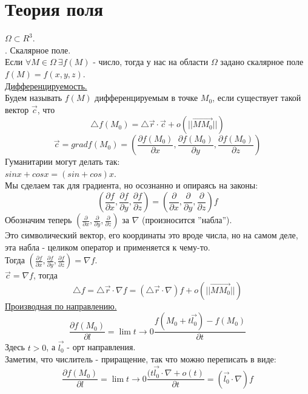 \documentclass[12pt]{article}
\begin{document}
\section{Теория поля}
$\Omega \subset R^3$.\\
. Скалярное поле.\\
Если $\forall M \in \Omega \ \exists f(M)$ - число, тогда у нас на области $\Omega$ задано скалярное поле $f(M) = f(x,y,z)$.\\
\uline{Дифференцируемость.}\\
Будем называть $f(M)$ дифференцируемым в точке $M_0$, если существует такой вектор $\overrightarrow{c}$, что\\
$${\bigtriangleup f}(M_0) = {\bigtriangleup \overrightarrow{r}} \cdot \overrightarrow{c} + o(||\overrightarrow{MM_0}||)$$
$$\overrightarrow{c} = grad f(M_0) = (\frac{\partial f(M_0)}{\partial x}, \frac{\partial f(M_0)}{\partial y}, \frac{\partial f(M_0)}{\partial z})$$
Гуманитарии могут делать так:\\
$sinx + cosx = (sin+cos)x$.\\
Мы сделаем так для градиента, но осознанно и опираясь на законы:\\
$$(\frac{\partial f}{\partial x},\frac{\partial f}{\partial y}, \frac{\partial f}{\partial z}) = (\frac{\partial}{\partial x},\frac{\partial}{\partial y},\frac{\partial}{\partial z})f$$
Обозначим теперь $(\frac{\partial}{\partial x},\frac{\partial}{\partial y},\frac{\partial}{\partial z})$ за $\nabla$ (произносится ''набла'').\\
Это символический вектор, его координаты это вроде числа, но на самом деле, эта набла - целиком оператор и применяется к чему-то.\\
Тогда $(\frac{\partial f}{\partial x},\frac{\partial f}{\partial y}, \frac{\partial f}{\partial z}) = {\nabla f}$.\\
$\overrightarrow{c} = {\nabla f}$, тогда\\
$${\bigtriangleup f} = {\bigtriangleup \overrightarrow{r}} \cdot {\nabla f} = ({\bigtriangleup \overrightarrow{r}} \cdot {\nabla})f + o(||\overrightarrow{MM_0}||)$$
\uline{Производная по направлению.}\\
$$\frac{\partial f (M_0)}{\partial l} = \lim{t\to 0} \frac{f(M_0+t\overrightarrow{l_0})-f(M_0)}{\partial t}$$
Здесь $t > 0$, а $\overrightarrow{l_0}$ - орт направления.\\
Заметим, что числитель - приращение, так что можно переписать в виде:\\
$$\frac{\partial f (M_0)}{\partial l} = \lim{t\to 0} \frac{(t \overrightarrow{l_0} \cdot \nabla + o(t)}{\partial t} = (\overrightarrow{l_0} \cdot \nabla)f$$
\end{document}

